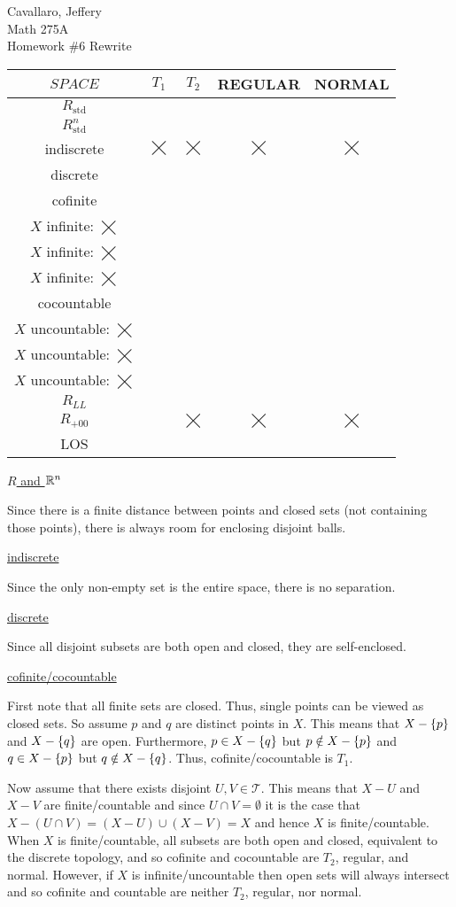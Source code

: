\documentclass[letterpaper,12pt,fleqn]{article}
\newcommand{\T}{\mathscr{T}}
\renewcommand{\C}{\checkmark}
\newcommand{\X}{\(\bigtimes\)}
\newcommand{\A}{
  \begin{minipage}{1.5in}
    \(X\) finite: \C \\
    \(X\) infinite: \X
  \end{minipage}
}
\newcommand{\B}{
  \begin{minipage}{1.5in}
    \(X\) countable: \C \\
    \(X\) uncountable: \X
  \end{minipage}
}
\begin{document}
Cavallaro, Jeffery \\
Math 275A \\
Homework \#6 Rewrite

\bigskip

\begin{example}[Exercise 4.13]
  \setlength\extrarowheight{2ex}
  \begin{tabular}{|c|c|c|c|c|}
    \hline
    \(SPACE\) & \(T_1\) & \(T_2\) & REGULAR & NORMAL \\
    \hline
    \(R_{\text{std}}\) & \C & \C & \C & \C \\
    \hline
    \(R^n_{\text{std}}\) & \C & \C & \C & \C \\
    \hline
    indiscrete & \X & \X & \X & \X \\
    \hline
    discrete & \C & \C & \C & \C \\
    \hline
    cofinite & \C & \A & \A & \A \\
    \hline
    cocountable & \C & \B & \B & \B \\
    \hline
    \(R_{LL}\) & \C & \C & \C & \C \\
    \hline
    \(R_{+00}\) & \C & \X & \X & \X \\
    \hline
    LOS & \C & \C & \C & \C \\
    \hline
  \end{tabular}

  \bigskip

  \underline{\(R\) and \(\mathbb{R}^n\)}

  Since there is a finite distance between points and closed sets (not containing those points), there is always room
  for enclosing disjoint balls.

  \underline{indiscrete}

  Since the only non-empty set is the entire space, there is no separation.

  \underline{discrete}

  Since all disjoint subsets are both open and closed, they are self-enclosed.

  \underline{cofinite/cocountable}

  First note that all finite sets are closed.  Thus, single points can be viewed as closed sets. So assume \(p\)
  and \(q\) are distinct points in \(X\).  This means that \(X-\{p\}\) and \(X-\{q\}\) are open.  Furthermore,
  \(p\in X-\{q\}\) but \(p\notin X-\{p\}\) and \(q\in X-\{p\}\) but \(q\notin X-\{q\}\).  Thus,
  cofinite/cocountable is \(T_1\).

  Now assume that there exists disjoint \(U,V\in\T\).  This means that \(X-U\) and \(X-V\) are finite/countable and
  since \(U\cap V=\emptyset\) it is the case that \(X-(U\cap V)=(X-U)\cup(X-V)=X\) and hence \(X\) is
  finite/countable.  When \(X\) is finite/countable, all subsets are both open and closed, equivalent to the
  discrete topology, and so cofinite and cocountable are \(T_2\), regular, and normal.  However, if \(X\) is
  infinite/uncountable then open sets will always intersect and so cofinite and countable are neither \(T_2\),
  regular, nor normal.


\end{example}
\end{document}
